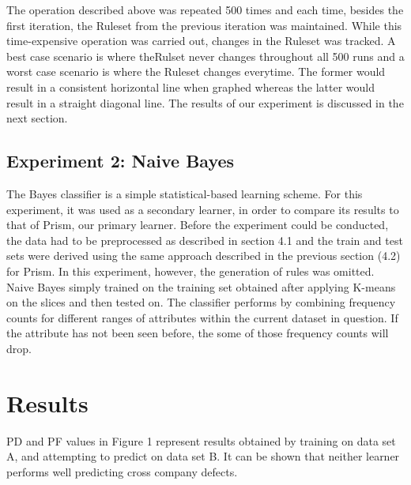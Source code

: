 \documentclass{sig-alternate}
\begin{document}
The operation described above was repeated 500 times and each time, besides the first iteration, the Ruleset from the previous iteration was maintained. While this time-expensive operation was carried out, changes in the Ruleset was tracked. A best case scenario is where theRulset never changes throughout all 500 runs and a worst case scenario is where the Ruleset changes everytime. The former would result in a consistent horizontal line when graphed whereas the latter would result in a straight diagonal line. The results of our experiment is discussed in the next section.

\subsection{Experiment 2: Naive Bayes}

The Bayes classifier is a simple statistical-based learning scheme. For this experiment, it was used as a secondary learner, in order to compare its results to that of Prism, our primary learner. Before the experiment could be conducted, the data had to be preprocessed as described in section 4.1 and the train and test sets were derived using the same approach described in the previous section (4.2) for Prism. In this experiment, however, the generation of rules was omitted. Naive Bayes simply trained on the training set obtained after applying K-means on the slices and then tested on. The classifier performs by combining frequency counts for different ranges of attributes within the current dataset in question. If the attribute has not been seen before, the some of those frequency counts will drop.



\section{Results}
PD and PF values in Figure 1 represent results obtained by training on data set A, and attempting to predict on data set B. It can be shown that neither learner performs well predicting cross company defects.
\end{document}
